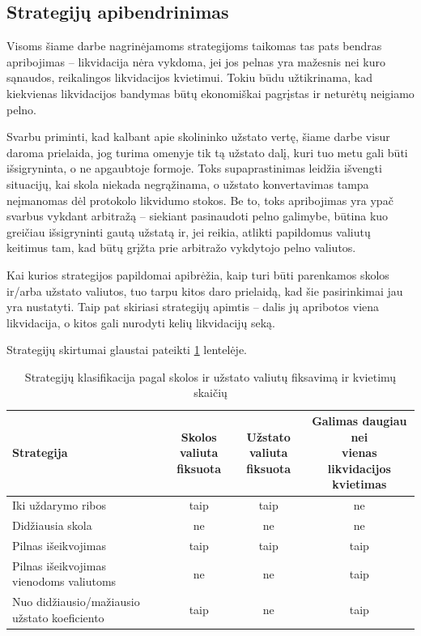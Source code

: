 \documentclass[]{VUMIFTemplateClass}
\begin{document}
\subsection{Strategijų apibendrinimas}
Visoms šiame darbe nagrinėjamoms strategijoms taikomas tas pats bendras apribojimas – likvidacija nėra vykdoma, jei jos pelnas yra mažesnis nei kuro sąnaudos, reikalingos likvidacijos kvietimui. Tokiu būdu užtikrinama, kad kiekvienas likvidacijos bandymas būtų ekonomiškai pagrįstas ir neturėtų neigiamo pelno.

Svarbu priminti, kad kalbant apie skolininko užstato vertę, šiame darbe visur daroma prielaida, jog turima omenyje tik tą užstato dalį, kuri tuo metu gali būti išsigryninta, o ne apgaubtoje formoje. Toks supaprastinimas leidžia išvengti situacijų, kai skola niekada negrąžinama, o užstato konvertavimas tampa neįmanomas dėl protokolo likvidumo stokos. Be to, toks apribojimas yra ypač svarbus vykdant arbitražą – siekiant pasinaudoti pelno galimybe, būtina kuo greičiau išsigryninti gautą užstatą ir, jei reikia, atlikti papildomus valiutų keitimus tam, kad būtų grįžta prie arbitražo vykdytojo pelno valiutos.

Kai kurios strategijos papildomai apibrėžia, kaip turi būti parenkamos skolos ir/arba užstato valiutos, tuo tarpu kitos daro prielaidą, kad šie pasirinkimai jau yra nustatyti. Taip pat skiriasi strategijų apimtis – dalis jų apribotos viena likvidacija, o kitos gali nurodyti kelių likvidacijų seką.

Strategijų skirtumai glaustai pateikti \ref{tab:strategiju_klasifikacija} lentelėje.

\begin{table}[H]
    \centering
    \caption{Strategijų klasifikacija pagal skolos ir užstato valiutų fiksavimą ir kvietimų skaičių}
    \begin{tabular}{|>{\raggedright\arraybackslash}p{5.5cm}|c|c|c|}
      \hline
      \textbf{Strategija} & \makecell{\textbf{Skolos valiuta} \\ \textbf{fiksuota}} & \makecell{\textbf{Užstato valiuta} \\ \textbf{fiksuota}} & \makecell{\textbf{Galimas daugiau nei} \\ \textbf{vienas likvidacijos kvietimas}} \\
      \hline
      Iki uždarymo ribos & taip & taip & ne \\
      \hline
      Didžiausia skola   & ne & ne & ne \\
      \hline
      Pilnas išeikvojimas  & taip & taip & taip \\
      \hline
      Pilnas išeikvojimas vienodoms valiutoms  & ne & ne & taip \\
      \hline
      Nuo didžiausio/mažiausio užstato koeficiento & taip & ne & taip \\
      \hline
    \end{tabular}
    \label{tab:strategiju_klasifikacija}
\end{table}
  
\end{document}
